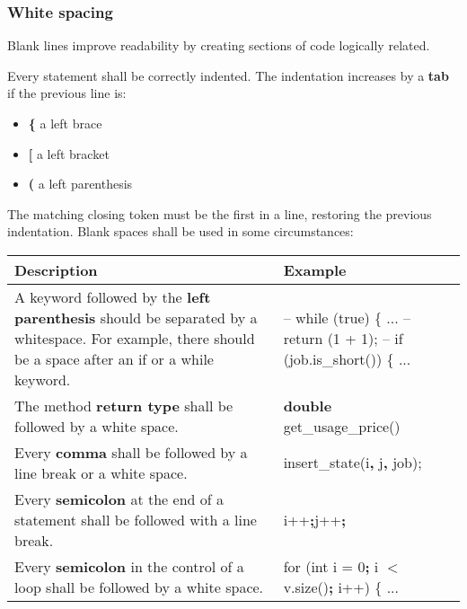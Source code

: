 \documentclass{scrreprt}
\begin{document}
\subsubsection{White spacing}

\par Blank lines improve readability by creating sections of code logically related. 
\par Every statement shall be correctly indented. The indentation increases by a \textbf{tab} if the previous line is:
\begin{itemize}
\item \textbf{\{} a left brace
\item \textbf{[} a left bracket
\item \textbf{(} a left parenthesis
\end{itemize}
The matching closing token must be the first in a line, restoring the previous indentation.
Blank spaces shall be used in some circumstances:

\begin{center}
    \begin{tabular}{|p{8cm}|p{6cm}|}
        \hline
	    Description & Example\\
        \hline
	    A keyword followed by the \textbf{left parenthesis} should be separated by a whitespace. \newline For example, there should be a space after an if or a while keyword. &  – while (true) \{ ... \newline – return (1 + 1); \newline – if (job.is_short()) \{ ... \\
	    \hline
	    The method \textbf{return type} shall be followed by a white space. & \textbf{double} get_usage_price() \\
	    \hline
	  	Every \textbf{comma} shall be followed by a line break or a white space. & insert_state(i\textbf{, }j\textbf{, }job); \\
	  	\hline
	  	Every \textbf{semicolon} at the end of a statement shall be followed with a line break. & i++\textbf{;}\newline j++\textbf{;}\\
	    \hline
	    Every \textbf{semicolon} in the control of a loop shall be followed by a white space. & for (int i = 0\textbf{; } i $<$ v.size()\textbf{; }i++) \{ ...\\
	    \hline
    \end{tabular}
\end{center}
\end{document}
